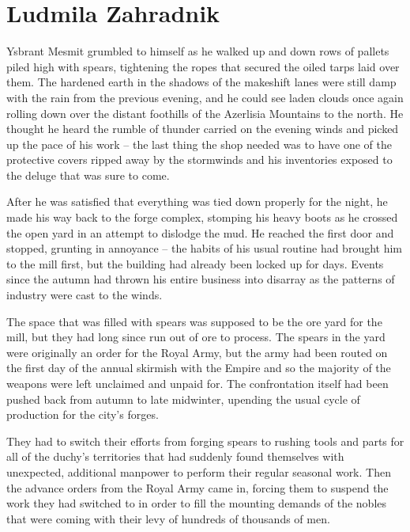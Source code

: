 \chapter{Ludmila Zahradnik}

Ysbrant Mesmit grumbled to himself as he walked up and down rows of pallets piled high with spears, tightening the ropes that secured the oiled tarps laid over them. The hardened earth in the shadows of the makeshift lanes were still damp with the rain from the previous evening, and he could see laden clouds once again rolling down over the distant foothills of the Azerlisia Mountains to the north. He thought he heard the rumble of thunder carried on the evening winds and picked up the pace of his work – the last thing the shop needed was to have one of the protective covers ripped away by the stormwinds and his inventories exposed to the deluge that was sure to come.

 

After he was satisfied that everything was tied down properly for the night, he made his way back to the forge complex, stomping his heavy boots as he crossed the open yard in an attempt to dislodge the mud. He reached the first door and stopped, grunting in annoyance – the habits of his usual routine had brought him to the mill first, but the building had already been locked up for days. Events since the autumn had thrown his entire business into disarray as the patterns of industry were cast to the winds.

 

The space that was filled with spears was supposed to be the ore yard for the mill, but they had long since run out of ore to process. The spears in the yard were originally an order for the Royal Army, but the army had been routed on the first day of the annual skirmish with the Empire and so the majority of the weapons were left unclaimed and unpaid for. The confrontation itself had been pushed back from autumn to late midwinter, upending the usual cycle of production for the city’s forges.

 

They had to switch their efforts from forging spears to rushing tools and parts for all of the duchy’s territories that had suddenly found themselves with unexpected, additional manpower to perform their regular seasonal work. Then the advance orders from the Royal Army came in, forcing them to suspend the work they had switched to in order to fill the mounting demands of the nobles that were coming with their levy of hundreds of thousands of men.

